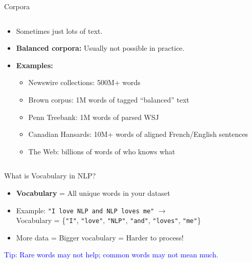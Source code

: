 \begin{frame}[allowframebreaks]{Corpora}
\begin{columns}
\begin{column}{0.6\textwidth}
\begin{itemize}
                \item Sometimes just lots of text.
                \item \textbf{Balanced corpora:} Usually not possible in practice.
                \item \textbf{Examples:}
                \begin{itemize}
                    \item Newswire collections: 500M+ words
                    \item Brown corpus: 1M words of tagged ``balanced'' text
                    \item Penn Treebank: 1M words of parsed WSJ
                    \item Canadian Hansards: 10M+ words of aligned French/English sentences
                    \item The Web: billions of words of who knows what
                \end{itemize}
            \end{itemize}
        \end{column}
    \end{columns}
\end{frame}

\begin{frame}{What is Vocabulary in NLP?}
    \begin{itemize}
        \item \textbf{Vocabulary} = All unique words in your dataset
        \item Example: \texttt{"I love NLP and NLP loves me"} $\rightarrow$ \\
        Vocabulary = \{\texttt{"I"}, \texttt{"love"}, \texttt{"NLP"}, \texttt{"and"}, \texttt{"loves"}, \texttt{"me"}\}
        \item More data = Bigger vocabulary = Harder to process!
    \end{itemize}
    \vspace{1em}
    \textcolor{blue}{\faLightbulbO\enspace Tip: Rare words may not help; common words may not mean much.}
\end{frame}

